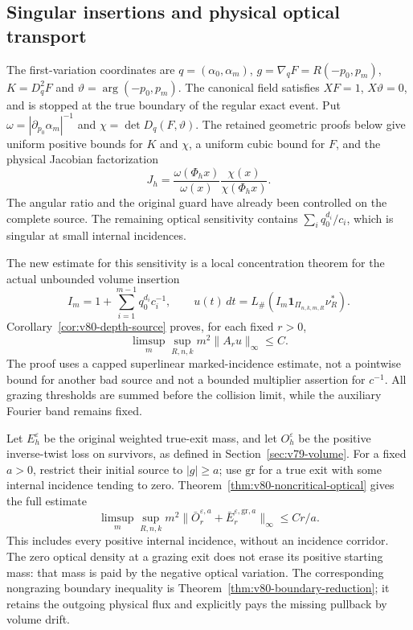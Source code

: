 \documentclass[11pt,reqno]{amsart}
\numberwithin{equation}{section}
\theoremstyle{definition}
\theoremstyle{remark}\newtheorem{remark}[theorem]{Remark}
\newcommand{\one}{\mathbf1}\newcommand{\dd}{\,\mathrm d}
\begin{document}
\subsection{Singular insertions and physical optical transport}
The first-variation coordinates are $q=(\alpha_0,\alpha_m)$,
$g=\nabla_qF=R(-p_0,p_m)$, $K=D_q^2F$ and
$\vartheta=\arg(-p_0,p_m)$. The canonical field satisfies
$XF=1$, $X\vartheta=0$, and is stopped at the true boundary of the
regular exact event. Put
$\omega=|\partial_{p_0}\alpha_m|^{-1}$ and
$\chi=\det D_q(F,\vartheta)$. The retained geometric proofs below
give uniform positive bounds for $K$ and $\chi$, a uniform cubic
bound for $F$, and the physical Jacobian factorization
\[
             J_h=\frac{\omega(\Phi_hx)}{\omega(x)}
                       \frac{\chi(x)}{\chi(\Phi_hx)}.
\]
The angular ratio and the original guard have already been controlled
on the complete source. The remaining optical sensitivity contains
$\sum_i q_0^{d_i}/c_i$, which is singular at small internal incidences.

The new estimate for this sensitivity is a local concentration theorem
for the actual unbounded volume insertion
\[
 I_m=1+\sum_{i=1}^{m-1}q_0^{d_i}c_i^{-1},\qquad
 u(t)\,dt=L_\#(I_m\one_{\Pi_{n,k,m,R}}\nu_R^*).
\]
Corollary~\ref{cor:v80-depth-source} proves, for each fixed $r>0$,
\[
              \limsup_m\sup_{R,n,k}m^2\|A_r u\|_\infty\le C.
\]
The proof uses a capped superlinear marked-incidence estimate, not a
pointwise bound for another bad source and not a bounded multiplier
assertion for $c^{-1}$. All grazing thresholds are summed before the
collision limit, while the auxiliary Fourier band remains fixed.

Let $E_h^\varepsilon$ be the original weighted true-exit mass, and
let $O_h^\varepsilon$ be the positive inverse-twist loss on survivors,
as defined in Section~\ref{sec:v79-volume}. For a fixed
$a>0$, restrict their initial source to $|g|\ge a$; use $\mathrm{gr}$
for a true exit with some internal incidence tending to zero.
Theorem~\ref{thm:v80-noncritical-optical} gives the full estimate
\[
 \limsup_m\sup_{R,n,k}m^2
       \|\bar O_r^{\varepsilon,a}
           +\bar E_r^{\varepsilon,\mathrm{gr},a}\|_\infty
                  \le Cr/a.
\]
This includes every positive internal incidence, without an incidence
corridor. The zero optical density at a grazing exit does not erase
its positive starting mass: that mass is paid by the negative optical
variation. The corresponding nongrazing boundary inequality is
Theorem~\ref{thm:v80-boundary-reduction}; it retains the outgoing
physical flux and explicitly pays the missing pullback by volume drift.
\end{document}
